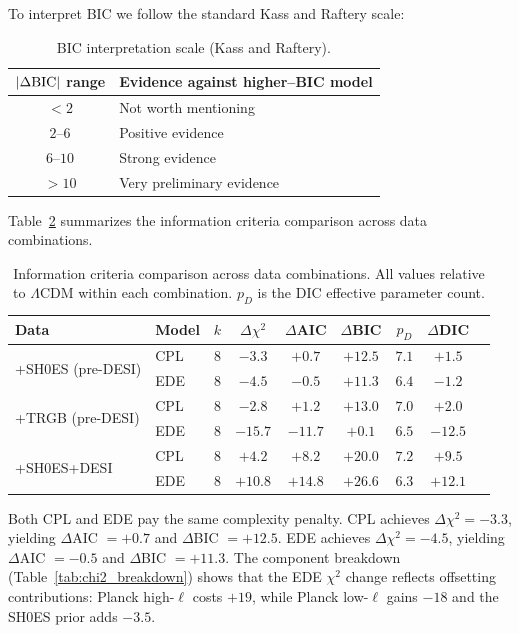 \documentclass[a4paper,11pt]{article}
\begin{document}
To interpret BIC we follow the standard Kass and Raftery scale:

\begin{table}[h]
\centering
\caption{BIC interpretation scale (Kass and Raftery).}
\label{tab:bic_scale}
\begin{tabular}{cl}
\toprule
$|\Delta{\rm BIC}|$ range & Evidence against higher--BIC model \\
\midrule
$< 2$ & Not worth mentioning \\
$2$--$6$ & Positive evidence \\
$6$--$10$ & Strong evidence \\
$> 10$ & Very preliminary evidence \\
\bottomrule
\end{tabular}
\end{table}

Table~\ref{tab:aic_bic} summarizes the information criteria comparison across data combinations.

\begin{table}[h]
\centering
\caption{Information criteria comparison across data combinations. All values relative to $\Lambda$CDM within each combination. $p_D$ is the DIC effective parameter count.}
\label{tab:aic_bic}
\begin{tabular}{llccccccc}
\toprule
Data & Model & $k$ & $\Delta\chi^2$ & $\Delta$AIC & $\Delta$BIC & $p_D$ & $\Delta$DIC \\
\midrule
\multirow{2}{*}{+SH0ES (pre-DESI)} 
& CPL & 8 & $-3.3$ & $+0.7$ & $+12.5$ & $7.1$ & $+1.5$ \\
& EDE & 8 & $-4.5$ & $-0.5$ & $+11.3$ & $6.4$ & $-1.2$ \\
\midrule
\multirow{2}{*}{+TRGB (pre-DESI)} 
& CPL & 8 & $-2.8$ & $+1.2$ & $+13.0$ & $7.0$ & $+2.0$ \\
& EDE & 8 & $-15.7$ & $-11.7$ & $+0.1$ & $6.5$ & $-12.5$ \\
\midrule
\multirow{2}{*}{+SH0ES+DESI} 
& CPL & 8 & $+4.2$ & $+8.2$ & $+20.0$ & $7.2$ & $+9.5$ \\
& EDE & 8 & $+10.8$ & $+14.8$ & $+26.6$ & $6.3$ & $+12.1$ \\
\bottomrule
\end{tabular}
\end{table}

Both CPL and EDE pay the same complexity penalty. CPL achieves $\Delta\chi^2 = -3.3$, yielding $\Delta$AIC $= +0.7$ and $\Delta$BIC $= +12.5$. EDE achieves $\Delta\chi^2 = -4.5$, yielding $\Delta$AIC $= -0.5$ and $\Delta$BIC $= +11.3$. The component breakdown (Table~\ref{tab:chi2_breakdown}) shows that the EDE $\chi^2$ change reflects offsetting contributions: Planck high-$\ell$ costs $+19$, while Planck low-$\ell$ gains $-18$ and the SH0ES prior adds $-3.5$.
\end{document}
